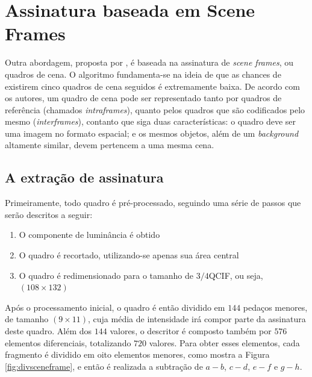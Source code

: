 \section{Assinatura baseada em Scene Frames}


Outra abordagem, proposta por \citeauthor{mao2015sceneframe}, é baseada na assinatura de \textit{scene frames}, ou quadros de cena. O algoritmo fundamenta-se na ideia de que as chances de existirem cinco quadros de cena seguidos é extremamente baixa. De acordo com os autores, um quadro de cena pode ser representado tanto por quadros de referência (chamados \textit{intraframes}), quanto pelos quadros que são codificados pelo mesmo (\textit{interframes}), contanto que siga duas características: o quadro deve ser uma imagem no formato espacial; e os mesmos objetos, além de um \textit{background} altamente similar, devem pertencem a uma mesma cena.

\subsection{A extração de assinatura}

Primeiramente, todo quadro é pré-processado, seguindo uma série de passos que serão descritos a seguir:

\begin{enumerate}
	\item O componente de luminância é obtido
   	\item O quadro é recortado, utilizando-se apenas sua área central
    \item O quadro é redimensionado para o tamanho de $3/4$QCIF, ou seja, $(108\times132)$
\end{enumerate}

Após o processamento inicial, o quadro é então dividido em $144$ pedaços menores, de tamanho $(9\times11)$, cuja média de intensidade irá compor parte da assinatura deste quadro. Além dos $144$ valores, o descritor é composto também por $576$ elementos diferenciais, totalizando $720$ valores. Para obter esses elementos, cada fragmento é dividido em oito elementos menores, como mostra a Figura \ref{fig:divsceneframe}, e então é realizada a subtração de $a - b$, $c - d$, $e - f$ e $g - h$.


